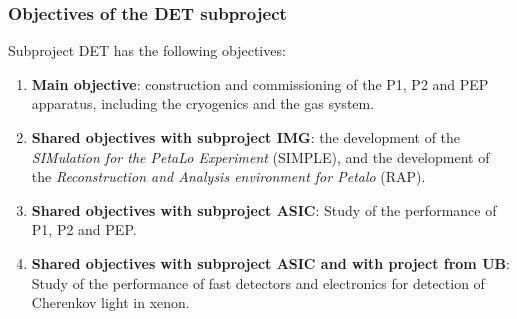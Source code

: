 \subsubsection*{Objectives of the DET subproject}
Subproject DET has the following objectives:
\begin{enumerate}
\item {\bf Main objective}: construction and commissioning of the P1, P2 and PEP apparatus, including the cryogenics and the gas system.
\item {\bf Shared objectives with subproject IMG}: the development of the {\em SIMulation for the PetaLo Experiment} (SIMPLE), and the development of the {\em Reconstruction and Analysis environment for Petalo} (RAP).
\item {\bf Shared objectives with subproject ASIC}: Study of the performance of P1, P2 and PEP. 
\item {\bf Shared objectives with subproject ASIC and with project from UB}: Study of the performance of fast detectors and electronics for detection of Cherenkov light in xenon. 
\end{enumerate}


